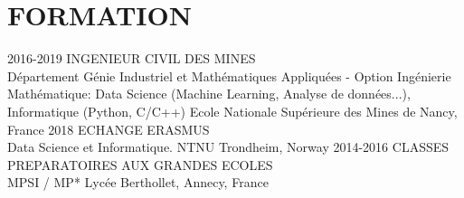 \documentclass[]{cv-style}          %
\begin{document}
\section{FORMATION}
%
\begin{entrylist}
\entry
{2016-2019}
{INGENIEUR CIVIL DES MINES\\
{\normalfont 
Département Génie Industriel et Mathématiques Appliquées - Option Ingénierie Mathématique: Data Science (Machine Learning, Analyse de données...), Informatique (Python, C/C++) \hspace{9cm}
}}
{Ecole Nationale Supérieure des Mines de Nancy, France}
{\vspace{-0.3cm}}
\entry
{2018}
{ECHANGE ERASMUS \\{\normalfont 
Data Science et Informatique.\hspace{9cm}}}
{NTNU Trondheim, Norway}
{\vspace{-0.3cm}}
\entry
{2014-2016}
{CLASSES PREPARATOIRES AUX GRANDES ECOLES \\{\normalfont MPSI / MP* \hspace{11cm}}}
{Lycée Berthollet, Annecy, France}
{}
\end{entrylist}
\vspace{-0.6cm}
\end{document}
